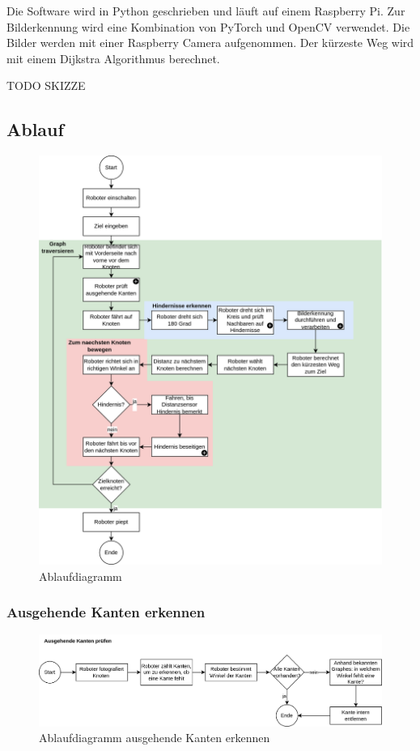 Die Software wird in Python geschrieben und läuft auf einem Raspberry Pi. Zur Bilderkennung wird eine Kombination von PyTorch und OpenCV verwendet. Die Bilder werden mit einer Raspberry Camera aufgenommen. Der kürzeste Weg wird mit einem Dijkstra Algorithmus berechnet.

TODO SKIZZE

\subsection{Ablauf}

\begin{figure}[H]
\centering
\includegraphics[width=\textwidth]{assets/gesamtkonzept/ablaufdiagramm.png}
\caption{Ablaufdiagramm}
\label{fig:ablaufdiagramm}
\end{figure}

\subsubsection{Ausgehende Kanten erkennen}

\begin{figure}[H]
\centering
\includegraphics[width=\textwidth]{assets/gesamtkonzept/ablaufdiagramm-kanten-erkennen.png}
\caption{Ablaufdiagramm ausgehende Kanten erkennen}
\label{fig:ablaufdiagramm-kanten-erkennen}
\end{figure}

